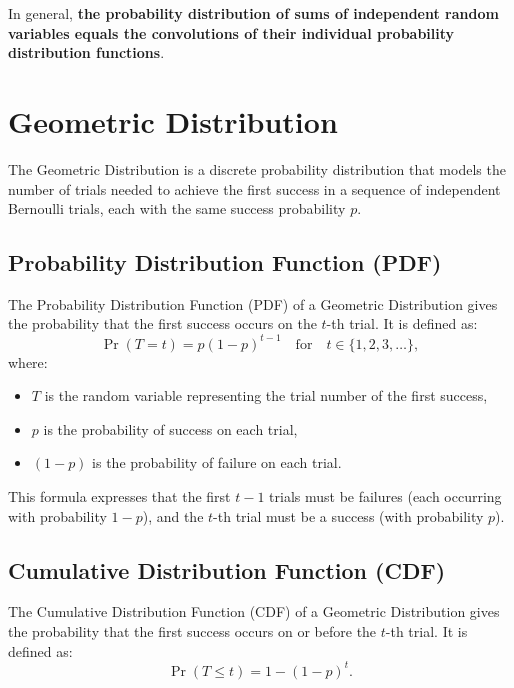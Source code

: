 \documentclass{masterthesis}
\begin{document}
In general, \textbf{the probability distribution of sums of independent random variables equals the convolutions of their individual probability distribution functions}.

\section*{Geometric Distribution}\label{section:geometric_distribution}

The Geometric Distribution is a discrete probability distribution that models the number of trials needed to achieve the first success in a sequence of independent Bernoulli trials, each with the same success probability \( p \).

\subsection*{Probability Distribution Function (PDF)}\label{subsection:geometric_pdf}

The Probability Distribution Function (PDF) of a Geometric Distribution gives the probability that the first success occurs on the \( t \)-th trial. It is defined as:
\begin{equation}
    \Pr(T = t) = p (1 - p)^{t-1} \quad \text{for} \quad t \in \{1, 2, 3, \ldots \},
\end{equation}
where:
\begin{itemize}
    \item $T$ is the random variable representing the trial number of the first success,
    \item $p$ is the probability of success on each trial,
    \item $(1 - p)$ is the probability of failure on each trial.
\end{itemize}

This formula expresses that the first \( t-1 \) trials must be failures (each occurring with probability \( 1 - p \)), and the \( t \)-th trial must be a success (with probability \( p \)).

\subsection*{Cumulative Distribution Function (CDF)}\label{subsection:geometric_cdf}

The Cumulative Distribution Function (CDF) of a Geometric Distribution gives the probability that the first success occurs on or before the \( t \)-th trial. It is defined as:
\begin{equation}
    \Pr(T \leq t) = 1 - (1 - p)^t.
\end{equation}
\end{document}

